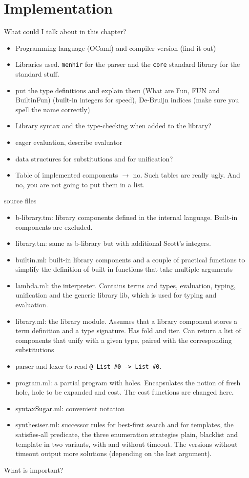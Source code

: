 \chapter{Implementation} \label{ch:implementation}

What could I talk about in this chapter?
\begin{itemize}
\item Programming language (OCaml) and compiler version (find it out)
\item Libraries used. \lstinline!menhir! for the parser and the \lstinline!core! standard library for the standard stuff.
\item put the type definitions and explain them (What are Fun, FUN and BuiltinFun) (built-in integers for speed), De-Bruijn indices (make sure you spell the name correctly)
\item Library syntax and the type-checking when added to the library?
\item eager evaluation, describe evaluator
\item data structures for substitutions and for unification?
\item Table of implemented components $\longrightarrow$ no. Such tables are really ugly. And no, you are not going to put them in a list.
\end{itemize}


source files
\begin{itemize}
\item b-library.tm: library components defined in the internal language. Built-in components are excluded.
\item library.tm: same as b-library but with additional Scott's integers.
\item builtin.ml: built-in library components and a couple of practical functions to simplify the definition of built-in functions that take multiple arguments
\item lambda.ml: the interpreter. Contains terms and types, evaluation, typing, unification and the generic library lib, which is used for typing and evaluation.
\item library.ml: the library module. Assumes that a library component stores a term definition and a type signature. Has fold and iter. Can return a list of components that unify with a given type, paired with the corresponding substitutions
\item parser and lexer to read \lstinline!@ List #0 -> List #0!.
\item program.ml: a partial program with holes. Encapsulates the notion of fresh hole, hole to be expanded and cost. The cost functions are changed here.
\item syntaxSugar.ml: convenient notation
\item synthesiser.ml: successor rules for best-first search and for templates, the satisfies-all predicate, the three enumeration strategies plain, blacklist and template in two variants, with and without timeout. The versions without timeout output more solutions (depending on the last argument).
\end{itemize}

What is important?



